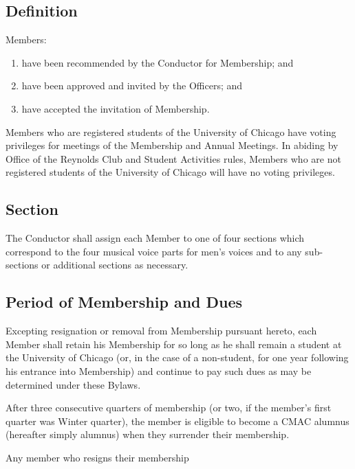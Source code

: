\documentclass{article}
\begin{document}
\subsection{Definition}

Members:
\begin{enumerate}
  \item have been recommended by the Conductor for Membership; and
  \item have been approved and invited by the Officers; and
  \item have accepted the invitation of Membership.
\end{enumerate}
Members who are registered students of the University of Chicago have
voting privileges for meetings of the Membership and Annual Meetings.
In abiding by Office of the Reynolds Club and Student Activities rules,
Members who are not registered students of the University of Chicago
will have no voting privileges.

\subsection{Section}

The Conductor shall assign each Member to one of four sections which
correspond to the four musical voice parts for men's voices and to
any sub-sections or additional sections as necessary.

\subsection{Period of Membership and Dues}

Excepting resignation or removal from Membership pursuant hereto,
each Member shall retain his Membership for so long as he shall remain
a student at the University of Chicago (or, in the case of a non-student,
for one year following his entrance into Membership) and continue
to pay such dues as may be determined under these Bylaws.

After three consecutive quarters of membership (or two, if the member's first
quarter was Winter quarter), the member is eligible to become a CMAC alumnus
(hereafter simply alumnus) when they surrender their membership.

Any member who resigns their membership

\end{document}
